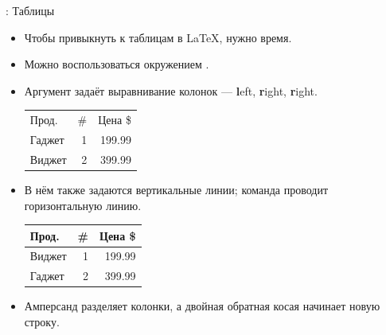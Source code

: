 \documentclass[usenames,dvipsnames]{beamer}
\begin{document}
\begin{frame}[fragile]{\insertsection: Таблицы}
\vspace{-3ex}
\begin{itemize}\small
\item Чтобы привыкнуть к таблицам в \LaTeX{}, нужно время.
\item Можно воспользоваться окружением .
\item Аргумент задаёт выравнивание колонок --- \textbf{l}eft, \textbf{r}ight, \textbf{r}ight.
\begin{exampletwouptiny}
\begin{tabular}{lrr}
Прод.  & \# & Цена \$ \\
Гаджет & 1  & 199.99  \\
Виджет & 2  & 399.99  \\
\end{tabular}
\end{exampletwouptiny}
\vspace{-1ex}
\item В нём также задаются вертикальные линии; команда  проводит горизонтальную линию.
\begin{exampletwouptiny}
\begin{tabular}{|l|r|r|} \hline
Прод.  & \# & Цена \$ \\\hline
Виджет & 1  & 199.99  \\
Гаджет & 2  & 399.99  \\\hline
\end{tabular}
\end{exampletwouptiny}
\item Амперсанд \keystrokebftt{\&} разделяет колонки, а двойная обратная косая
  \keystrokebftt{\bs}\keystrokebftt{\bs} начинает новую строку.
\end{itemize}
\end{frame}
\end{document}
